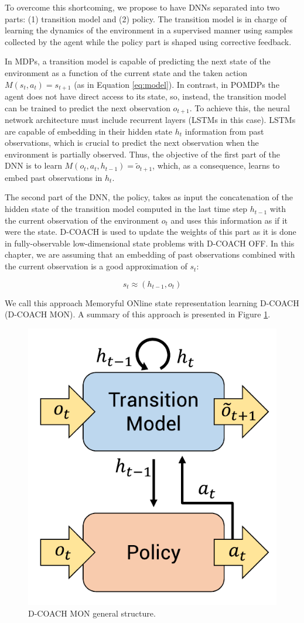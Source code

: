 To overcome this shortcoming, we propose to have DNNs separated into two parts: (1) transition model and (2) policy. The transition model is in charge of learning the dynamics of the environment in a supervised manner using samples collected by the agent while the policy part is shaped using corrective feedback. 

In MDPs, a transition model is capable of predicting the next state of the environment as a function of the current state and the taken action $M(s_{t},a_{t}) = s_{t+1}$ (as in Equation \ref{eq:model}). In contrast, in POMDPs the agent does not have direct access to its state, so, instead, the transition model can be trained to predict the next observation $o_{t+1}$. To achieve this, the neural network architecture must include recurrent layers (LSTMs in this case). LSTMs are capable of embedding in their hidden state $h_{t}$ information from past observations, which is crucial to predict the next observation when the environment is partially observed. Thus, the objective of the first part of the DNN is to learn $M(o_{t},a_{t}, h_{t-1}) = \widetilde o_{t+1}$, which, as a consequence, learns to embed past observations in $h_{t}$.

The second part of the DNN, the policy, takes as input the concatenation of the hidden state of the transition model computed in the last time step $h_{t-1}$ with the current observation of the environment $o_{t}$ and uses this information as if it were the state. D-COACH is used to update the weights of this part as it is done in fully-observable low-dimensional state problems with D-COACH OFF. In this chapter, we are assuming that an embedding of past observations combined with the current observation is a good approximation of $s_{t}$:

\begin{equation}
s_{t}\approx (h_{t-1}, o_{t})    
\end{equation}

We call this approach Memoryful ONline state representation learning D-COACH (D-COACH MON). A summary of this approach is presented in Figure \ref{fig:mb_dcoach}.

\begin{figure}[h]
    \centering
    \includegraphics[width=0.4\linewidth]{imagenes/cap4/model_based_dcoach.pdf}
    \caption{D-COACH MON general structure.}
    \label{fig:mb_dcoach}
\end{figure}

